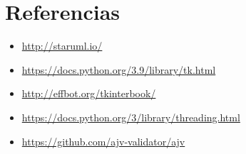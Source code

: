 \section{Referencias}

\begin{itemize}
	\item \href{http://staruml.io/}{http://staruml.io/}
	\item \href{https://docs.python.org/3.9/library/tk.html}{https://docs.python.org/3.9/library/tk.html}
	\item \href{http://effbot.org/tkinterbook/}{http://effbot.org/tkinterbook/}
	\item \href{https://docs.python.org/3/library/threading.html}{https://docs.python.org/3/library/threading.html}
	\item \href{https://github.com/ajv-validator/ajv}{https://github.com/ajv-validator/ajv}
\end{itemize}